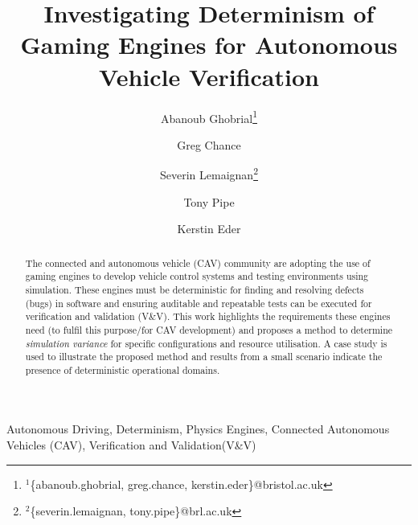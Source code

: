 \title{Investigating Determinism of Gaming Engines for Autonomous Vehicle Verification}


\author[1,3]{Abanoub Ghobrial\thanks{$^{1}${\footnotesize \{abanoub.ghobrial, greg.chance, kerstin.eder\}@bristol.ac.uk}}}
\author[1,3]{Greg Chance}
\author[2,3]{Severin Lemaignan\thanks{$^{2}${\footnotesize \{severin.lemaignan, tony.pipe\}@brl.ac.uk}}}
\author[2,3]{Tony Pipe}
\author[1,3]{Kerstin Eder}





\maketitle

\begin{abstract}
\noindent 
The connected and autonomous vehicle (CAV) community are adopting the use of gaming engines to develop vehicle control systems and testing environments using simulation. These engines must be deterministic for finding and resolving defects (bugs) in software and ensuring auditable and repeatable tests can be executed for verification and validation (V\&V). This work highlights the requirements these engines need (to fulfil this purpose/for CAV development) and proposes a method to determine \textit{simulation variance} for specific configurations and resource utilisation. A case study is used to illustrate the proposed method and results from a small scenario indicate the presence of deterministic operational domains. 
\end{abstract}

\begin{IEEEkeywords}
Autonomous Driving, Determinism, Physics Engines, Connected Autonomous Vehicles (CAV), Verification and Validation(V\&V)
\end{IEEEkeywords}
\IEEEpeerreviewmaketitle
